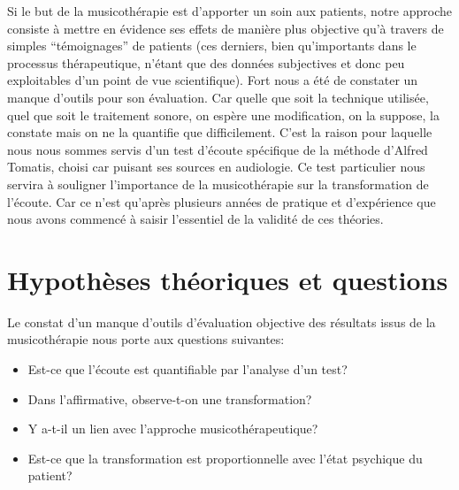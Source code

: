 Si le but de la musicothérapie est d'apporter un soin aux patients,
notre  approche consiste à mettre en évidence ses effets de manière
plus objective qu'à travers de simples ``témoignages'' de patients (ces derniers, bien qu'importants dans le processus thérapeutique,
n'étant que des données subjectives et donc peu exploitables d'un
point de vue scientifique). Fort nous a été de
constater un manque d'outils pour son évaluation. Car quelle que soit la technique utilisée, quel que soit
le traitement sonore, on espère une modification, on la suppose, la constate
 mais
 on ne la quantifie que difficilement. C'est la raison pour laquelle
 nous nous sommes servis d'un test d'écoute
 spécifique de la méthode d'Alfred Tomatis, choisi car puisant ses
 sources en audiologie.
 Ce test particulier  nous servira à
 souligner l'importance de la musicothérapie 
 sur la transformation de l'écoute.
 Car ce n'est qu'après plusieurs
années de pratique et d'expérience que nous avons commencé à saisir
l'essentiel de la validité de ces théories.


 

  


\section {Hypothèses théoriques et questions}




   Le constat d'un manque
   d'outils d'évaluation objective des résultats issus de la
   musicothérapie  nous porte aux questions
   suivantes:  
\begin{itemize}
 \item Est-ce que l'écoute est quantifiable par
          l'analyse d'un test?
        \item Dans l'affirmative, observe-t-on une transformation?
         \item Y a-t-il  un lien avec l'approche musicothérapeutique?
  \item Est-ce que la transformation est proportionnelle avec l'état psychique du patient?
   \end{itemize}
 

